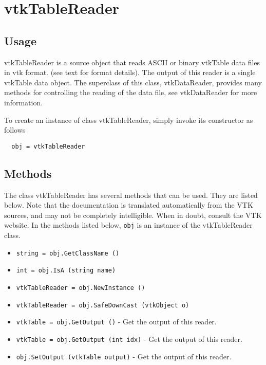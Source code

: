\section{vtkTableReader}

\subsection{Usage}

 vtkTableReader is a source object that reads ASCII or binary 
 vtkTable data files in vtk format. (see text for format details).
 The output of this reader is a single vtkTable data object.
 The superclass of this class, vtkDataReader, provides many methods for
 controlling the reading of the data file, see vtkDataReader for more
 information.

To create an instance of class vtkTableReader, simply
invoke its constructor as follows
\begin{verbatim}
  obj = vtkTableReader
\end{verbatim}
\subsection{Methods}

The class vtkTableReader has several methods that can be used.
  They are listed below.
Note that the documentation is translated automatically from the VTK sources,
and may not be completely intelligible.  When in doubt, consult the VTK website.
In the methods listed below, \verb|obj| is an instance of the vtkTableReader class.
\begin{itemize}
\item  \verb|string = obj.GetClassName ()|

\item  \verb|int = obj.IsA (string name)|

\item  \verb|vtkTableReader = obj.NewInstance ()|

\item  \verb|vtkTableReader = obj.SafeDownCast (vtkObject o)|

\item  \verb|vtkTable = obj.GetOutput ()| -  Get the output of this reader.

\item  \verb|vtkTable = obj.GetOutput (int idx)| -  Get the output of this reader.

\item  \verb|obj.SetOutput (vtkTable output)| -  Get the output of this reader.

\end{itemize}
